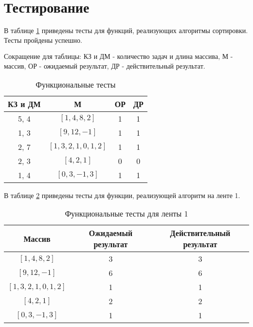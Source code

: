 \captionsetup{singlelinecheck = false, justification=centering}

\section{Тестирование}

В таблице \ref{tbl:functional_test} приведены тесты для функций, реализующих алгоритмы сортировки. Тесты пройдены успешно.

Сокращение для таблицы: КЗ и ДМ - количество задач и длина массива, М - массив, ОР - ожидаемый результат, ДР - действительный результат.

\begin{table}[h]
	\begin{center}
	\caption{\label{tbl:functional_test} Функциональные тесты}
		\begin{tabular}{|c|c|c|c|}
			\hline
			КЗ и ДМ & М & ОР & ДР \\ 
			\hline
			5, 4  & $[1,4,8,2]$        & 1 & 1\\
			1, 3  & $[9,12,-1]$        & 1 & 1\\
			2, 7  & $[1,3,2,1,0,1,2]$  & 1 & 1\\
			2, 3  & $[4,2,1]$          & 0 & 0\\
			1, 4  & $[0,3,-1,3]$       & 1 & 1\\
			\hline
		\end{tabular}
	\end{center}
\end{table}

В таблице \ref{tbl:ft2} приведены тесты для функции, реализующей алгоритм на ленте 1.

\begin{table}[h]
	\begin{center}
		\caption{\label{tbl:ft2} Функциональные тесты для ленты 1}
		\begin{tabular}{|c|c|c|}
			\hline
			Массив & Ожидаемый результат & Действительный результат \\ 
			\hline
			 $[1,4,8,2]$        & 3 & 3\\
			 $[9,12,-1]$        & 6 & 6\\
			 $[1,3,2,1,0,1,2]$  & 1 & 1\\
			 $[4,2,1]$          & 2 & 2\\
			 $[0,3,-1,3]$       & 1 & 1\\
			\hline
		\end{tabular}
	\end{center}
\end{table}

